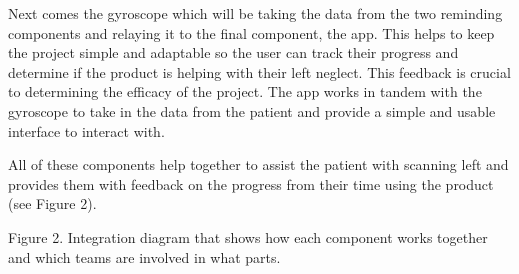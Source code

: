 Next comes the gyroscope which will be taking the data from the two reminding
components and relaying it to the final component, the app. This helps to keep
the project simple and adaptable so the user can track their progress and
determine if the product is helping with their left neglect. This feedback is
crucial to determining the efficacy of the project. The app works in tandem with
the gyroscope to take in the data from the patient and provide a simple and
usable interface to interact with. 

All of these components help together to assist the patient with scanning left
and provides them with feedback on the progress from their time using the
product (see Figure 2). 


Figure 2. Integration diagram that shows how each component works together and which teams are involved in what parts. 

